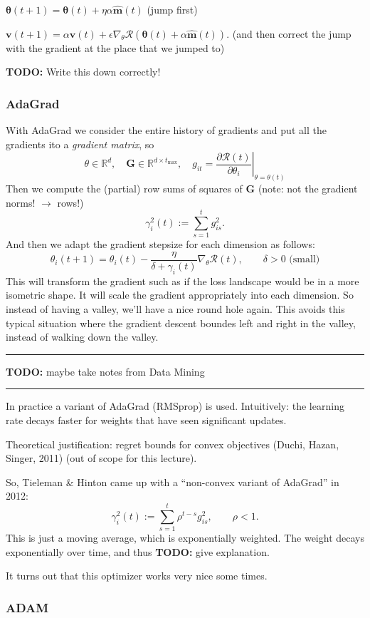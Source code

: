 \documentclass[a2paper,8pt]{extarticle}
\newcommand{\R}{\mathbb{R}}
\newcommand{\cR}{\mathcal{R}}
\newcommand{\mat}[1]{\mathbf{#1}}
\renewcommand{\vec}[1]{\mathbf{#1}}
\newcommand{\vv}{\vec{v}}
\newcommand{\vhm}{\widehat{\vec{m}}}
\newcommand{\vtheta}{\boldsymbol{\theta}}
\newcommand{\MG}{\mat{G}}
\newcommand{\evalat}[2]{\left. #1 \right|_{#2}}
\newcommand{\todo}[1]{\textbf{TODO:} #1}
\newcommand{\todo}[1]{%
}
\newcommand{\sep}{\vspace{0pt}\noindent\hrule\vspace{0pt}}
\newcommand{\sep}{\vspace{5pt}\noindent\hrule\vspace{5pt}}
\begin{document}
\begin{landscape}
\begin{multicols*}{7}
$
\vtheta(t+1)=\vtheta(t)+\eta\alpha\vhm(t)
$ (jump first)

$
\vv(t+1)=\alpha \vv(t) +
\epsilon\nabla_\theta\cR(\vtheta(t)+\alpha\vhm(t)).
$ (and then correct the jump with the gradient at the place that we jumped to)

\todo{Write this down correctly!}

\subsubsection{AdaGrad}

With AdaGrad we consider the entire history of gradients and put all the
gradients ito a \emph{gradient matrix}, so
\[
\theta\in\R^d,
\quad
\MG\in\R^{d\times t_{\max}},
\quad
g_{it}
=
\evalat{\frac{\partial \cR(t)}{\partial \theta_i}}{\theta=\theta(t)}
\]
Then we compute the (partial) row sums of squares of $\MG$ (note: not the
gradient norms! $\to$ rows!)
\[
\gamma_i^2(t):=\sum_{s=1}^tg_{is}^2.
\]
And then we adapt the gradient stepsize for each dimension as follows:
\[
\theta_i(t+1)=\theta_i(t)-\frac{\eta}{\delta+\gamma_i(t)}\nabla_\theta\cR(t),
\qquad
\delta>0\text{ (small)}
\]
This will transform the gradient such as if the loss landscape would be in a
more isometric shape. It will scale the gradient appropriately into each
dimension. So instead of having a valley, we'll have a nice round hole again.
This avoids this typical situation where the gradient descent boundes left and
right in the valley, instead of walking down the valley.

\sep

\todo{maybe take notes from Data Mining}

\sep

In practice a variant of AdaGrad (RMSprop) is used. Intuitively: the learning
rate decays faster for weights that have seen significant updates.

Theoretical justification: regret bounds for convex objectives (Duchi, Hazan,
Singer, 2011) (out of scope for this lecture).

So, Tieleman \& Hinton came up with a ``non-convex variant of AdaGrad'' in 2012:
\[
\gamma_i^2(t):=\sum_{s=1}^t\rho^{t-s}g_{is}^2,
\qquad
\rho<1.
\]
This is just a moving average, which is exponentially weighted. The weight
decays exponentially over time, and thus \todo{give explanation}.

It turns out that this optimizer works very nice some times.

\subsubsection{ADAM}


\end{multicols*}
\end{landscape}
\end{document}
